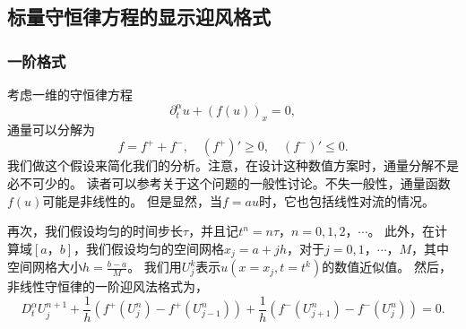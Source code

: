 \subsection{标量守恒律方程的显示迎风格式}

\subsubsection{一阶格式}
考虑一维的守恒律方程
\begin{equation}\label{eq:cons}
\partial_t^\alpha u+ (f(u))_x=0,
\end{equation}
通量可以分解为
\begin{equation}\label{cond:flux}
f=f^+ + f^- ,\quad (f^+)' \ge 0,\quad (f^-)'\le 0.
\end{equation}
我们做这个假设来简化我们的分析。注意，在设计这种数值方案时，通量分解不是必不可少的。 读者可以参考关于这个问题的一般性讨论。不失一般性，通量函数$f(u)$可能是非线性的。 但是显然，当$f = au$时，它也包括线性对流的情况。

再次，我们假设均匀的时间步长$\tau $，并且记$t ^ n = n\tau $，$ n = 0,1,2，\cdots $。 此外，在计算域$ [a，b] $，我们假设均匀的空间网格$ x_j = a + jh $，对于$ j = 0,1，\cdots，M $，其中空间网格大小$h=\frac{b-a}{M}$。 我们用$ U_j ^ k $表示$u\left(x=x_j,t=t^k\right)$的数值近似值。 然后，非线性守恒律的一阶迎风法格式为，
\begin{equation}\label{firstorder}
D_t^\alpha U^{n+1}_j + \frac{1}{h} \left(f^+ (U_j^n)- f^+(U_{j-1}^n) \right)+\frac{1}{h}\left(f^-(U_{j+1}^n)-f^-(U_j^n)\right) =0.
\end{equation}

